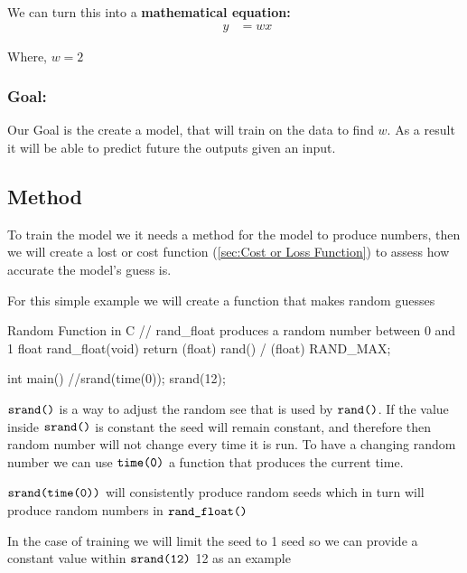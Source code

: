 \documentclass{report}
\begin{document}
We can turn this into a \textbf{ mathematical equation:} 
\begin{align*}
    \qquad y &= w x 
\end{align*}

Where, $w = 2$


\subsubsection{Goal:} %
\label{sec:Goal:}

Our Goal is the create a model, that will train on the data to find $w$. As a result it will be able to predict future the outputs given an input.

\subsection{Method} %
\label{sub:Method}

To train the model we it needs a method for the model to produce numbers, then we will create a lost or cost function (\ref{sec:Cost or Loss Function}) to assess how accurate the model's guess is.

For this simple example we will create a function that makes random guesses



\begin{code}[language=c]{Random Function in C}
// rand_float produces a random number between 0 and 1 
float rand_float(void) {
    return (float) rand() / (float) RAND_MAX; 
}

int main(){
    //srand(time(0)); 
    srand(12);
}
\end{code}

$\verb|srand()|$ is a way to adjust the random see that is used by $\verb|rand()|$. If the value inside $\verb|srand()|$ is constant the seed will remain constant, and therefore then random number will not change every time it is run. To have a changing random number we can use $\verb|time(0)|$ a function that produces the current time.  


$\verb|srand(time(0))|$ will consistently produce random seeds which in turn will produce random numbers in $\verb|rand_float()|$


In the case of training we will limit the seed to 1 seed so we can provide a constant value within $\verb|srand(12)|$ 12 as an example





\end{document}
